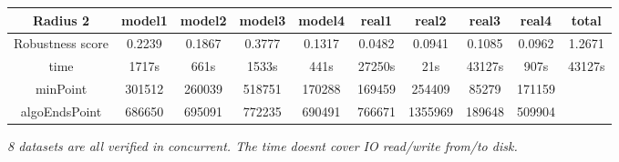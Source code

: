 \documentclass{article}
\begin{document}
\begin{table}[!htbp]
\begin{adjustwidth}{-1cm}{}
\begin{threeparttable}
\begin{tabular}{|c|c|c|c|c|c|c|c|c|c|}
				\textbf{Radius 2} & \textbf{model1} & \textbf{model2} & \textbf{model3} & \textbf{model4} & \textbf{real1} & \textbf{real2} & \textbf{real3} & \textbf{real4} & \textbf{total} \\ \hline
				Robustness score                 & 0.2239          & 0.1867          & 0.3777          & 0.1317          & 0.0482         & 0.0941         & 0.1085         & 0.0962         & 1.2671         \\ \hline
				time                             & 1717s           & 661s            & 1533s           & 441s            & 27250s         & 21s            & 43127s         & 907s           & 43127s         \\ \hline
				minPoint                         & 301512          & 260039          & 518751          & 170288          & 169459         & 254409         & 85279          & 171159         &                \\ \hline
				algoEndsPoint                    & 686650          & 695091          & 772235          & 690491          & 766671         & 1355969        & 189648         & 509904         &                \\ \hline
				
			\end{tabular}
			\begin{tablenotes}
				\small
				\item\textit{ 8 datasets are all verified in concurrent. The time doesn\textquotesingle t cover IO read/write from/to disk.}
				\end{tablenotes}			
			\end{threeparttable}
		\end{adjustwidth}	
	\end{table}
	
\end{document}

